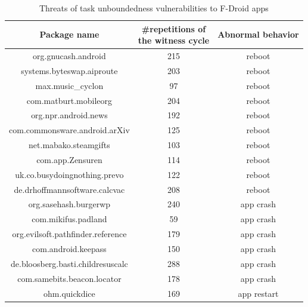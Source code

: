 \begin{table}[htbp]
	\begin{center}   
		\begin{tabular}{|c|c|c|}   
			\hline   
			\textbf{Package name} & \shortstack{\#repetitions of \\ the witness cycle} & \textbf{Abnormal behavior} \\   
			\hline
			\hline   
			 org.gnucash.android & 215 & reboot  \\ 
			\hline   
			 systems.byteswap.aiproute & 203 &reboot  \\ 
			\hline   
			  max.music\_cyclon & 97  &reboot \\ 
			\hline   
			com.matburt.mobileorg & 204  &reboot \\ 
			\hline    org.npr.android.news & 192  &reboot \\ 
			\hline    com.commonsware.android.arXiv & 125  &reboot \\ 
			\hline    net.mabako.steamgifts & 103  &reboot \\ 
			\hline     com.app.Zensuren & 114  &reboot \\ 
			\hline   uk.co.busydoingnothing.prevo & 122  &reboot \\ 
			\hline    de.drhoffmannsoftware.calcvac & 208  &reboot \\ 
			\hline     org.sasehash.burgerwp & 240  &app crash \\ 
			\hline    com.mikifus.padland & 59 &app crash  \\ 
			\hline    org.evilsoft.pathfinder.reference & 179 &app crash  \\ 
			\hline     com.android.keepass & 150 & app crash  \\ 
			\hline    de.bloosberg.basti.childresuscalc & 288 & app crash  \\ 
			\hline    com.samebits.beacon.locator & 178 & app crash  \\ 
			\hline     ohm.quickdice & 169 & app restart  \\ 
			\hline
		\end{tabular}
	\caption{Threats of task unboundedness vulnerabilities to F-Droid apps }
	 \label{tab:threat-fd-task}
\end{center}
\end{table}

